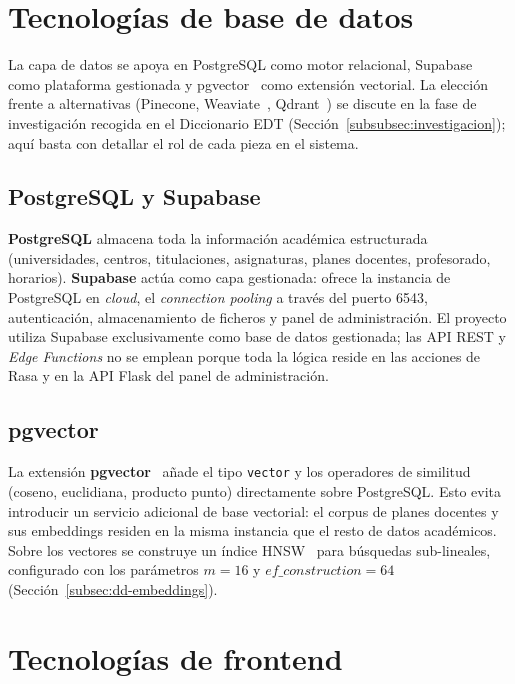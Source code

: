 \section{Tecnologías de base de datos}\label{sec:base-datos}

La capa de datos se apoya en PostgreSQL como motor relacional, Supabase~\cite{supabasedocs} como plataforma gestionada y pgvector~\cite{pgvectorgithub} como extensión vectorial. La elección frente a alternativas (Pinecone, Weaviate~\cite{weaviatedocs}, Qdrant~\cite{qdrantdocs}) se discute en la fase de investigación recogida en el Diccionario EDT (Sección~\ref{subsubsec:investigacion}); aquí basta con detallar el rol de cada pieza en el sistema.

\subsection{PostgreSQL y Supabase}

\textbf{PostgreSQL} almacena toda la información académica estructurada (universidades, centros, titulaciones, asignaturas, planes docentes, profesorado, horarios). \textbf{Supabase} actúa como capa gestionada: ofrece la instancia de PostgreSQL en \textit{cloud}, el \textit{connection pooling} a través del puerto 6543, autenticación, almacenamiento de ficheros y panel de administración. El proyecto utiliza Supabase exclusivamente como base de datos gestionada; las API REST y \textit{Edge Functions} no se emplean porque toda la lógica reside en las acciones de Rasa y en la API Flask del panel de administración.

\subsection{pgvector}

La extensión \textbf{pgvector}~\cite{pgvectorgithub} añade el tipo \texttt{vector} y los operadores de similitud (coseno, euclidiana, producto punto) directamente sobre PostgreSQL. Esto evita introducir un servicio adicional de base vectorial: el corpus de planes docentes y sus embeddings residen en la misma instancia que el resto de datos académicos. Sobre los vectores se construye un índice HNSW~\cite{malkov2018hnsw} para búsquedas sub-lineales, configurado con los parámetros $m=16$ y $ef\_construction=64$ (Sección~\ref{subsec:dd-embeddings}).

\section{Tecnologías de frontend}\label{sec:frontend}

